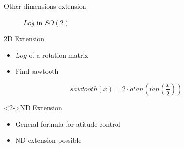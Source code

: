 \documentclass[10pt, xcolor={usenames, dvipsnames}]{beamer}
\begin{document}
        \begin{frame}{Other dimensions extension}
            \centering
            \begin{minipage}{.45\textwidth}
                \begin{figure}
                    \centering
                    \caption{$Log$ in $SO(2)$}
                \end{figure}
            \end{minipage}
            \hfill
            \begin{minipage}{.5\textwidth}
                \begin{block}{2D Extension}
                    \vspace{.25cm}
                    \begin{itemize}
                        \item $Log$ of a rotation matrix
                        \item Find sawtooth
                    \end{itemize}
                    \begin{equation}
                        sawtooth(x) = 2 \cdot atan\left(tan\left(\frac{x}{2}\right)\right)
                    \end{equation}
                \end{block}
                \begin{block}<2->{ND Extension}
                    \begin{itemize}
                        \item General formula for atitude control
                        \item ND extension possible
                    \end{itemize}
                \end{block}
            \end{minipage}
        \end{frame}
\end{document}
